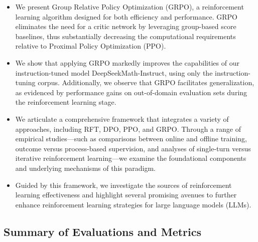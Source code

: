 \begin{itemize}[topsep=0pt]
    \item We present Group Relative Policy Optimization (GRPO), a reinforcement learning algorithm designed for both efficiency and performance. GRPO eliminates the need for a critic network by leveraging group-based score baselines, thus substantially decreasing the computational requirements relative to Proximal Policy Optimization (PPO).
    \item We show that applying GRPO markedly improves the capabilities of our instruction-tuned model DeepSeekMath-Instruct, using only the instruction-tuning corpus. Additionally, we observe that GRPO facilitates generalization, as evidenced by performance gains on out-of-domain evaluation sets during the reinforcement learning stage.
    \item We articulate a comprehensive framework that integrates a variety of approaches, including RFT, DPO, PPO, and GRPO. Through a range of empirical studies—such as comparisons between online and offline training, outcome versus process-based supervision, and analyses of single-turn versus iterative reinforcement learning—we examine the foundational components and underlying mechanisms of this paradigm.
    \item Guided by this framework, we investigate the sources of reinforcement learning effectiveness and highlight several promising avenues to further enhance reinforcement learning strategies for large language models (LLMs).
\end{itemize}

\subsection{Summary of Evaluations and Metrics}

